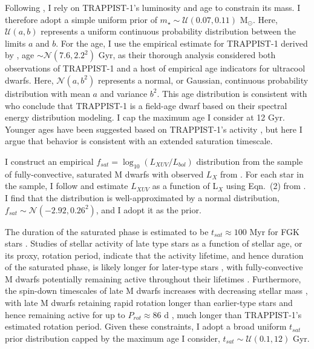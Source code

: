 Following \citet{vanGrootel2018}, I rely on TRAPPIST-1's luminosity and age to constrain its mass. I therefore adopt a simple uniform prior of $m_{\star} \sim \mathcal{U}(0.07, 0.11)$ M$_{\odot}$. Here, $\mathcal{U}(a, b)$ represents a uniform continuous probability distribution between the limits $a$ and $b$. For the age, I use the empirical estimate for TRAPPIST-1 derived by \citet{Burgasser2017}, age $\sim \mathcal{N}(7.6, 2.2^2)$ Gyr, as their thorough analysis considered both observations of TRAPPIST-1 and a host of empirical age indicators for ultracool dwarfs. Here, $\mathcal{N}(a, b^2)$ represents a normal, or Gaussian, continuous probability distribution with mean $a$ and variance $b^2$. This age distribution is consistent with \citet{Gonzales2019} who conclude that TRAPPIST-1 is a field-age dwarf based on their spectral energy distribution modeling. I cap the maximum age I consider at 12 Gyr. Younger ages have been suggested based on TRAPPIST-1's activity \citep[e.g.~$\gsim 500$ Myr,][]{Bourrier2017b}, but here I argue that behavior is consistent with an extended saturation timescale.

I construct an empirical $f_{sat} = \log_{10}(L_{XUV}/L_{bol})$ distribution from the sample of fully-convective, saturated M dwarfs with observed $L_{X}$ from \citet{Wright2011}. For each star in the \citet{Wright2011} sample, I follow \citet{Wheatley2017} and estimate $L_{XUV}$ as a function of L$_{X}$ using Eqn.~(2) from \citet{Chadney2015}. I find that the distribution is well-approximated by a normal distribution, $f_{sat} \sim \mathcal{N}(-2.92, 0.26^2)$, and I adopt it as the prior.  

The duration of the saturated phase is estimated to be $t_{sat} \approx 100$ Myr for FGK stars \citep{Jackson2012}. Studies of stellar activity of late type stars as a function of stellar age, or its proxy, rotation period, indicate that the activity lifetime, and hence duration of the saturated phase, is likely longer for later-type stars \citep{Shkolnik2014,Wright2011,West2015}, with fully-convective M dwarfs potentially remaining active throughout their lifetimes \citep[$t_{sat} \gsim 7$ Gyr,][]{West2008,Schneider2018}. Furthermore, the spin-down timescales of late M dwarfs increases with decreasing stellar mass \citep{Delfosse1998}, with late M dwarfs retaining rapid rotation longer than earlier-type stars and hence remaining active for up to $P_{rot} \approx 86$ d \citep{West2015}, much longer than TRAPPIST-1's estimated rotation period. Given these constraints, I adopt a broad uniform $t_{sat}$ prior distribution capped by the maximum age I consider, $t_{sat} \sim \mathcal{U}(0.1, 12)$ Gyr. 

